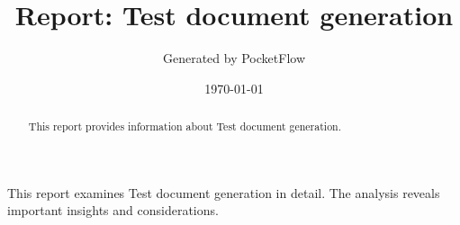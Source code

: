 \documentclass[11pt,a4paper]{article}
\begin{document}
\title{Report: Test document generation}
\author{Generated by PocketFlow}
\date{\today}

\maketitle

\begin{abstract}
This report provides information about Test document generation.
\end{abstract}

\tableofcontents
\newpage

This report examines Test document generation in detail. The analysis reveals important insights and considerations.
\end{document}
